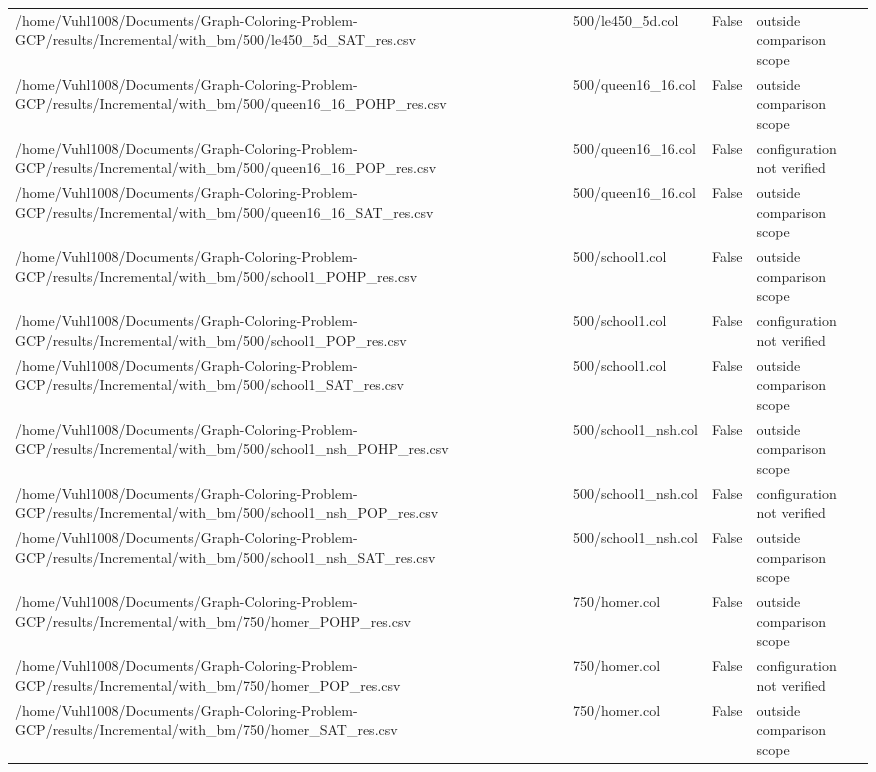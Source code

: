 \begin{table}[htbp]
\begin{tabular}{llll}
/home/Vuhl1008/Documents/Graph-Coloring-Problem-GCP/results/Incremental/with\_bm/500/le450\_5d\_SAT\_res.csv & 500/le450\_5d.col & False & outside comparison scope \\
/home/Vuhl1008/Documents/Graph-Coloring-Problem-GCP/results/Incremental/with\_bm/500/queen16\_16\_POHP\_res.csv & 500/queen16\_16.col & False & outside comparison scope \\
/home/Vuhl1008/Documents/Graph-Coloring-Problem-GCP/results/Incremental/with\_bm/500/queen16\_16\_POP\_res.csv & 500/queen16\_16.col & False & configuration not verified \\
/home/Vuhl1008/Documents/Graph-Coloring-Problem-GCP/results/Incremental/with\_bm/500/queen16\_16\_SAT\_res.csv & 500/queen16\_16.col & False & outside comparison scope \\
/home/Vuhl1008/Documents/Graph-Coloring-Problem-GCP/results/Incremental/with\_bm/500/school1\_POHP\_res.csv & 500/school1.col & False & outside comparison scope \\
/home/Vuhl1008/Documents/Graph-Coloring-Problem-GCP/results/Incremental/with\_bm/500/school1\_POP\_res.csv & 500/school1.col & False & configuration not verified \\
/home/Vuhl1008/Documents/Graph-Coloring-Problem-GCP/results/Incremental/with\_bm/500/school1\_SAT\_res.csv & 500/school1.col & False & outside comparison scope \\
/home/Vuhl1008/Documents/Graph-Coloring-Problem-GCP/results/Incremental/with\_bm/500/school1\_nsh\_POHP\_res.csv & 500/school1\_nsh.col & False & outside comparison scope \\
/home/Vuhl1008/Documents/Graph-Coloring-Problem-GCP/results/Incremental/with\_bm/500/school1\_nsh\_POP\_res.csv & 500/school1\_nsh.col & False & configuration not verified \\
/home/Vuhl1008/Documents/Graph-Coloring-Problem-GCP/results/Incremental/with\_bm/500/school1\_nsh\_SAT\_res.csv & 500/school1\_nsh.col & False & outside comparison scope \\
/home/Vuhl1008/Documents/Graph-Coloring-Problem-GCP/results/Incremental/with\_bm/750/homer\_POHP\_res.csv & 750/homer.col & False & outside comparison scope \\
/home/Vuhl1008/Documents/Graph-Coloring-Problem-GCP/results/Incremental/with\_bm/750/homer\_POP\_res.csv & 750/homer.col & False & configuration not verified \\
/home/Vuhl1008/Documents/Graph-Coloring-Problem-GCP/results/Incremental/with\_bm/750/homer\_SAT\_res.csv & 750/homer.col & False & outside comparison scope \\

\end{tabular}
\end{table}
